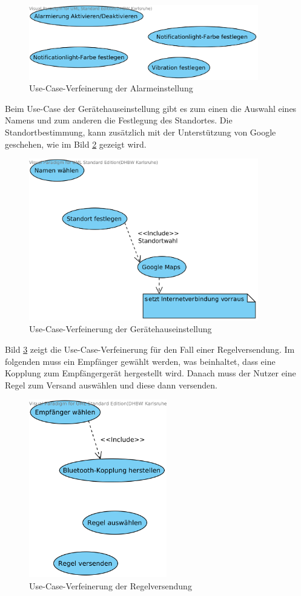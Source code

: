 \begin{figure}[!ht]
\centering
\includegraphics[width=10cm]{Bilder/UseCaseAlarmeinstellung.png}
\caption{Use-Case-Verfeinerung der Alarmeinstellung}
\label{Alarmeinstellung Use Case}
\centering
\end{figure}
Beim Use-Case der Ger\"atehauseinstellung gibt es zum einen die Auswahl eines Namens und zum anderen die Festlegung des Standortes. Die Standortbestimmung, kann zus\"atzlich mit der Unterst\"utzung von Google geschehen, wie im Bild \ref{Geraetehauseinstellung Use Case} gezeigt wird.
\begin{figure}[!ht]
\centering
\includegraphics[width=10cm]{Bilder/UseCaseGeraetehauseinstellung.png}
\caption{Use-Case-Verfeinerung der Ger\"atehauseinstellung}
\label{Geraetehauseinstellung Use Case}
\centering
\end{figure}

\newpage

Bild \ref{Regelversendung Use Case} zeigt die Use-Case-Verfeinerung f\"ur den Fall einer Regelversendung. Im folgenden muss ein Empf\"anger gew\"ahlt werden, was beinhaltet, dass eine Kopplung zum Empf\"angerger\"at hergestellt wird. Danach muss der Nutzer eine Regel zum Versand ausw\"ahlen und diese dann versenden. 
\begin{figure}[!ht]
\centering
\includegraphics[width=6cm]{Bilder/UseCaseRegelVersenden.png}
\caption{Use-Case-Verfeinerung der Regelversendung}
\label{Regelversendung Use Case}
\centering
\end{figure}

